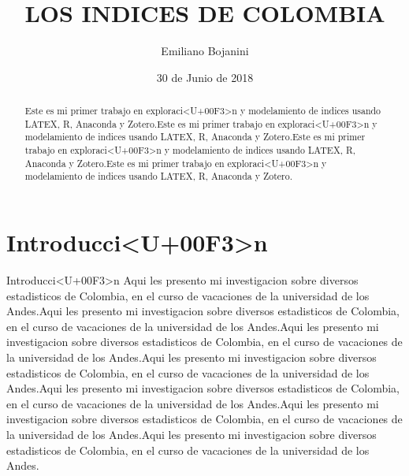 \usepackage[utf8]{inputenc}
\usepackage{longtable}
\usepackage{authblk}
\usepackage{adjustbox}
\usepackage{natbib}
\title{LOS INDICES DE COLOMBIA}
\renewcommand\Authand{, y }
\author[1]{\normalsize Emiliano Bojanini}
\date{30 de Junio de 2018}
\usepackage{Sweave}


\maketitle
\begin{abstract}
Este es mi primer trabajo en exploraci<U+00F3>n y modelamiento de indices usando LATEX, R, Anaconda y Zotero.Este es mi primer trabajo en exploraci<U+00F3>n y modelamiento de indices usando LATEX, R, Anaconda y Zotero.Este es mi primer trabajo en exploraci<U+00F3>n y modelamiento de indices usando LATEX, R, Anaconda y Zotero.Este es mi primer trabajo en exploraci<U+00F3>n y modelamiento de indices usando LATEX, R, Anaconda y Zotero.
\end{abstract}
\section*{Introducci<U+00F3>n}
Introducci<U+00F3>n
Aqui les presento mi investigacion sobre diversos estadisticos de Colombia, en el curso de vacaciones de la universidad de los Andes.Aqui les presento mi investigacion sobre diversos estadisticos de Colombia, en el curso de vacaciones de la universidad de los Andes.Aqui les presento mi investigacion sobre diversos estadisticos de Colombia, en el curso de vacaciones de la universidad de los Andes.Aqui les presento mi investigacion sobre diversos estadisticos de Colombia, en el curso de vacaciones de la universidad de los Andes.Aqui les presento mi investigacion sobre diversos estadisticos de Colombia, en el curso de vacaciones de la universidad de los Andes.Aqui les presento mi investigacion sobre diversos estadisticos de Colombia, en el curso de vacaciones de la universidad de los Andes.Aqui les presento mi investigacion sobre diversos estadisticos de Colombia, en el curso de vacaciones de la universidad de los Andes.
\clearpage
